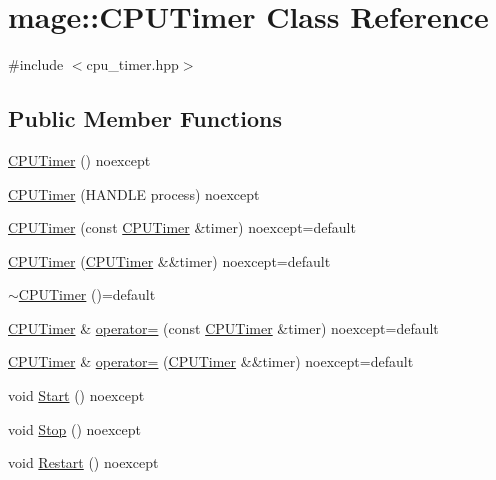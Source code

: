 \hypertarget{classmage_1_1_c_p_u_timer}{}\section{mage\+:\+:C\+P\+U\+Timer Class Reference}
\label{classmage_1_1_c_p_u_timer}


{\ttfamily \#include $<$cpu\+\_\+timer.\+hpp$>$}

\subsection*{Public Member Functions}
\begin{DoxyCompactItemize}
\item 
\hyperlink{classmage_1_1_c_p_u_timer_a52f2c0bdd6377df54363ff775a6ec430}{C\+P\+U\+Timer} () noexcept
\item 
\hyperlink{classmage_1_1_c_p_u_timer_ae85f321f737770034cff1fd9e9ef13c4}{C\+P\+U\+Timer} (H\+A\+N\+D\+LE process) noexcept
\item 
\hyperlink{classmage_1_1_c_p_u_timer_a23afe7d7b5d85ecf1275f750a935e7c3}{C\+P\+U\+Timer} (const \hyperlink{classmage_1_1_c_p_u_timer}{C\+P\+U\+Timer} \&timer) noexcept=default
\item 
\hyperlink{classmage_1_1_c_p_u_timer_a7915bc9952e7607ffbe93f18dd1cb0b4}{C\+P\+U\+Timer} (\hyperlink{classmage_1_1_c_p_u_timer}{C\+P\+U\+Timer} \&\&timer) noexcept=default
\item 
\hyperlink{classmage_1_1_c_p_u_timer_a32583449026cf0589104767339486d4b}{$\sim$\+C\+P\+U\+Timer} ()=default
\item 
\hyperlink{classmage_1_1_c_p_u_timer}{C\+P\+U\+Timer} \& \hyperlink{classmage_1_1_c_p_u_timer_a22c40a268b8638b6f78c678fc392e4b2}{operator=} (const \hyperlink{classmage_1_1_c_p_u_timer}{C\+P\+U\+Timer} \&timer) noexcept=default
\item 
\hyperlink{classmage_1_1_c_p_u_timer}{C\+P\+U\+Timer} \& \hyperlink{classmage_1_1_c_p_u_timer_a9c831808d8caa71a019b5e4a6ffe360c}{operator=} (\hyperlink{classmage_1_1_c_p_u_timer}{C\+P\+U\+Timer} \&\&timer) noexcept=default
\item 
void \hyperlink{classmage_1_1_c_p_u_timer_abcb6e468bad9fb821c18502b6445b696}{Start} () noexcept
\item 
void \hyperlink{classmage_1_1_c_p_u_timer_ae2fa5b36f436fd160d7f5b91783c0f11}{Stop} () noexcept
\item 
void \hyperlink{classmage_1_1_c_p_u_timer_aad56acfa4f2990d6894d75721ba16f15}{Restart} () noexcept

\end{DoxyCompactItemize}
